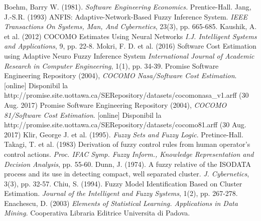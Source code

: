 \begin{thebibliography}{9}
Boehm, Barry W. (1981). \textit{Software Engineering Economics.} Prentice-Hall. 
Jang, J.-S.R. (1993) ANFIS: Adaptive-Network-Based Fuzzy Inference System. \textit{IEEE Transactions On Systems, Man, And Cybernetics}, 23(3), pp. 665-685.
Kaushik, A. et al. (2012) COCOMO Estimates Using Neural Networks \textit{I.J. Intelligent Systems and Applications}, 9, pp. 22-8.
Mokri, F. D. et al. (2016) Software Cost Estimation using Adaptive Neuro Fuzzy Inference System \textit{International Journal of Academic Research in Computer Engineering}, 1(1), pp. 34-39.
Promise Software Engineering Repository (2004), \textit{COCOMO Nasa/Software Cost Estimation}. [online] Disponibil la http://promise.site.uottawa.ca/SERepository/datasets/cocomonasa\_v1.arff (30 Aug. 2017)
Promise Software Engineering Repository (2004), \textit{COCOMO 81/Software Cost Estimation}. [online] Disponibil la http://promise.site.uottawa.ca/SERepository/datasets/cocomo81.arff (30 Aug. 2017)
Klir, George J. et al. (1995). \textit{Fuzzy Sets and Fuzzy Logic}. Pretince-Hall.
Takagi, T. et al. (1983) Derivation of fuzzy control rules from human operator's control actions. \textit{Proc. IFAC Symp. Fuzzy Inform., Knowledge Representation and Decision Analysis}, pp. 55-60.
Dunn, J. (1974). A fuzzy relative of the ISODATA process and its use in detecting compact, well separated cluster. \textit{J. Cybernetics}, 3(3), pp. 32-57.
Chiu, S. (1994). Fuzzy Model Identification Based on Cluster Estimation. \textit{Journal of the Intelligent and Fuzzy Systems}, 1(2), pp. 267-278.
Enachescu, D. (2003) \textit{Elements of Statistical Learning. Applications in Data Mining.} Cooperativa Libraria Editrice Universita di Padova.
\end{thebibliography}
